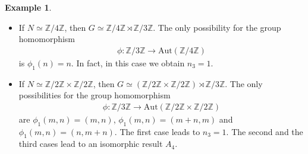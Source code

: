 \documentclass[12pt]{report}
\theoremstyle{plain}
\theoremstyle{remark}
\theoremstyle{definition}
\newtheorem{example}[theorem]{Example}
\newcommand{\Z}{\mathbb{Z}}
\begin{document}
\begin{example}
    \begin{itemize}
        \item If $N\simeq \Z/4\Z$, then $G\simeq \Z/4\Z\rtimes\Z/3\Z$. The only possibility for the group homomorphism
        \begin{align*}
            \phi:\Z/3\Z\rightarrow \mathrm{Aut}(\Z/4\Z)
        \end{align*}
        is $\phi_1(n)=n$. In fact, in this case we obtain $n_3=1$.
        \item If $N\simeq \Z/2\Z\times\Z/2\Z$, then $G\simeq (\Z/2\Z\times\Z/2\Z)\rtimes\Z/3\Z$. The only possibilities for the group homomorphism
        \begin{align*}
            \phi:\Z/3\Z\rightarrow \mathrm{Aut}(\Z/2\Z\times\Z/2\Z)
        \end{align*}
        are $\phi_1(m,n)=(m,n)$, $\phi_1(m,n)=(m+n,m)$ and $\phi_1(m,n)=(n,m+n)$. The first case leads to $n_3=1$. The second and the third cases lead to an isomorphic result $A_4$.
    \end{itemize}


\end{example}
\end{document}
